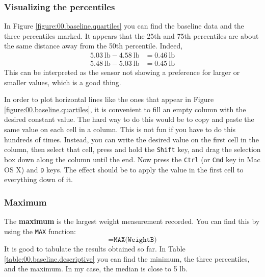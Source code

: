 \subsubsection{Visualizing the percentiles}
%
In Figure \ref{figure:00.baseline.quartiles} you can find the baseline data and the three percentiles marked. It appears that the 25th and 75th percentiles are about the same distance away from the 50th percentile. Indeed,
\begin{align}
    5.03 \ \text{lb} - 4.58 \ \text{lb} &= 0.46 \ \text{lb} \\
    5.48 \ \text{lb} - 5.03 \ \text{lb} &= 0.45 \ \text{lb}
\end{align}
This can be interpreted as the sensor not showing a preference for larger or smaller values, which is a good thing.

In order to plot horizontal lines like the ones that appear in Figure \ref{figure:00.baseline.quartiles}, it is convenient to fill an empty column with the desired constant value. The hard way to do this would be to copy and paste the same value on each cell in a column. This is not fun if you have to do this hundreds of times. Instead, you can write the desired value on the first cell in the column, then select that cell, press and hold the \texttt{Shift} key, and drag the selection box down along the column until the end. Now press the \texttt{Ctrl} (or \texttt{Cmd} key in Mac OS X) and \texttt{D} keys. The effect should be to apply the value in the first cell to everything down of it.
%
\subsubsection{Maximum}
%
The \textbf{maximum} is the largest weight measurement recorded. You can find this by using the \texttt{MAX} function:
\begin{equation}
    \texttt{=MAX(WeightB)}
    \label{eq:00.max}
\end{equation}
It is good to tabulate the results obtained so far. In Table \ref{table:00.baseline.descriptive} you can find the minimum, the three percentiles, and the maximum. In my case, the median is close to 5 lb.
%
\begin{center}
\end{center}
%
